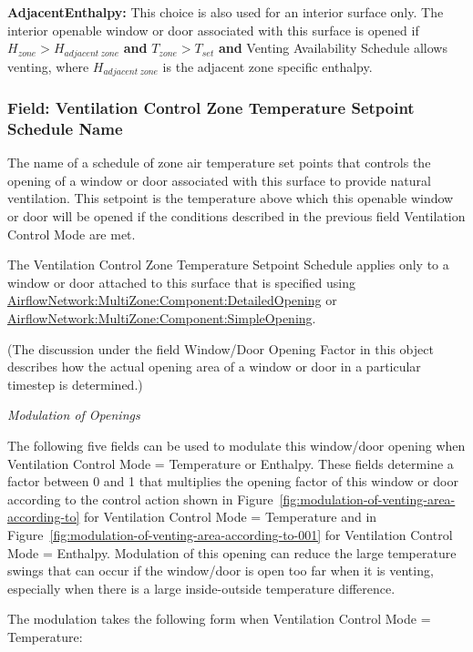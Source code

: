 \textbf{AdjacentEnthalpy:} This choice is also used for an interior surface only.
The interior openable window or door associated with this surface is opened if
$H_{zone} > H_{adjacent\ zone}$ \textbf{and} $T_{zone} > T_{set}$ \textbf{and}
Venting Availability Schedule allows venting, where $H_{adjacent\ zone}$ is the
adjacent zone specific enthalpy.

\subsubsection{Field: Ventilation Control Zone Temperature Setpoint Schedule Name}\label{field-ventilation-control-zone-temperature-setpoint-schedule-name-1}

The name of a schedule of zone air temperature set points that controls the opening of a window or door associated with this surface to provide natural ventilation. This setpoint is the temperature above which this openable window or door will be opened if the conditions described in the previous field Ventilation Control Mode are met.

The Ventilation Control Zone Temperature Setpoint Schedule applies only to a window or door attached to this surface that is specified using \hyperref[airflownetworkmultizonecomponentdetailedopening]{AirflowNetwork:MultiZone:Component:DetailedOpening} or \hyperref[airflownetworkmultizonecomponentsimpleopening]{AirflowNetwork:MultiZone:Component:SimpleOpening}.

(The discussion under the field Window/Door Opening Factor in this object describes how the actual opening area of a window or door in a particular timestep is determined.)

\emph{Modulation of Openings}

The following five fields can be used to modulate this window/door opening when Ventilation Control Mode = Temperature or Enthalpy. These fields determine a factor between 0 and 1 that multiplies the opening factor of this window or door according to the control action shown in Figure~\ref{fig:modulation-of-venting-area-according-to} for Ventilation Control Mode = Temperature and in Figure~\ref{fig:modulation-of-venting-area-according-to-001} for Ventilation Control Mode = Enthalpy. Modulation of this opening can reduce the large temperature swings that can occur if the window/door is open too far when it is venting, especially when there is a large inside-outside temperature difference.

The modulation takes the following form when Ventilation Control Mode = Temperature:


